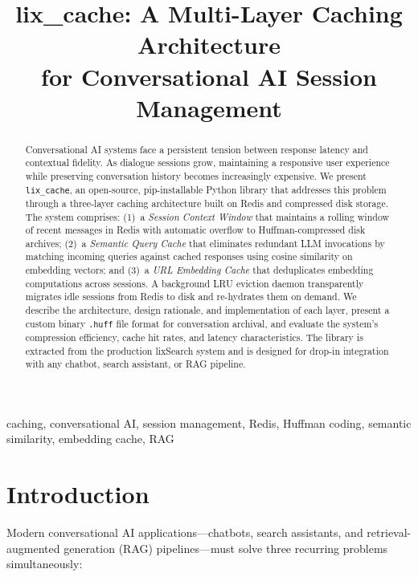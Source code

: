 \documentclass[conference]{IEEEtran}
\title{lix\_cache: A Multi-Layer Caching Architecture\\for Conversational AI Session Management}
\author{
\IEEEauthorblockN{Elixpo Research}
\IEEEauthorblockA{search.elixpo.com}
}
\begin{document}
\maketitle

\begin{abstract}
Conversational AI systems face a persistent tension between response latency and contextual fidelity. As dialogue sessions grow, maintaining a responsive user experience while preserving conversation history becomes increasingly expensive. We present \texttt{lix\_cache}, an open-source, pip-installable Python library that addresses this problem through a three-layer caching architecture built on Redis and compressed disk storage. The system comprises: (1)~a \emph{Session Context Window} that maintains a rolling window of recent messages in Redis with automatic overflow to Huffman-compressed disk archives; (2)~a \emph{Semantic Query Cache} that eliminates redundant LLM invocations by matching incoming queries against cached responses using cosine similarity on embedding vectors; and (3)~a \emph{URL Embedding Cache} that deduplicates embedding computations across sessions. A background LRU eviction daemon transparently migrates idle sessions from Redis to disk and re-hydrates them on demand. We describe the architecture, design rationale, and implementation of each layer, present a custom binary \texttt{.huff} file format for conversation archival, and evaluate the system's compression efficiency, cache hit rates, and latency characteristics. The library is extracted from the production lixSearch system and is designed for drop-in integration with any chatbot, search assistant, or RAG pipeline.
\end{abstract}

\begin{IEEEkeywords}
caching, conversational AI, session management, Redis, Huffman coding, semantic similarity, embedding cache, RAG
\end{IEEEkeywords}

\section{Introduction}

Modern conversational AI applications---chatbots, search assistants, and retrieval-augmented generation (RAG) pipelines---must solve three recurring problems simultaneously:
\end{document}
